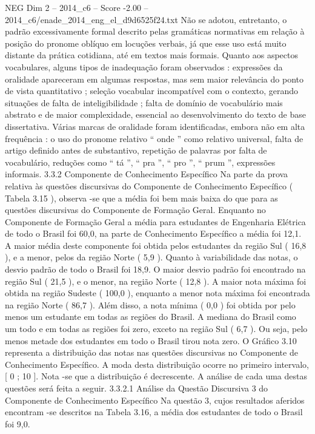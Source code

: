 \begin{textsample}{NEG Dim 2 – 2014\_c6 – Score -2.00 – 2014\_c6/enade\_2014\_eng\_el\_d9d6525f24.txt}
Não se adotou, entretanto, o padrão excessivamente formal descrito pelas gramáticas normativas em relação à posição do pronome oblíquo em locuções verbais, já que esse uso está muito distante da prática cotidiana, até em textos mais formais.
Quanto aos aspectos vocabulares, alguns tipos de inadequação foram observados : expressões da oralidade apareceram em algumas respostas, mas sem maior relevância do ponto de vista quantitativo ; seleção vocabular incompatível com o contexto, gerando situações de falta de inteligibilidade ; falta de domínio de vocabulário mais abstrato e de maior complexidade, essencial ao desenvolvimento do texto de base dissertativa.
Várias marcas de oralidade foram identificadas, embora não em alta frequência : o uso do pronome relativo “ onde ” como relativo universal, falta de artigo definido antes de substantivo, repetição de palavras por falta de vocabulário, reduções como “ tá ”, “ pra ”, “ pro ”, “ prum ”, expressões informais. 3.3.2 Componente de Conhecimento Específico Na parte da prova relativa às questões discursivas do Componente de Conhecimento Específico ( Tabela 3.15 ), observa -se que a média foi bem mais baixa do que para as questões discursivas do Componente de Formação Geral.
Enquanto no Componente de Formação Geral a média para estudantes de Engenharia Elétrica de todo o Brasil foi 60,0, na parte de Conhecimento Específico a média foi 12,1.
A maior média deste componente foi obtida pelos estudantes da região Sul ( 16,8 ), e a menor, pelos da região Norte ( 5,9 ).
Quanto à variabilidade das notas, o desvio padrão de todo o Brasil foi 18,9.
O maior desvio padrão foi encontrado na região Sul ( 21,5 ), e o menor, na região Norte ( 12,8 ).
A maior nota máxima foi obtida na região Sudeste ( 100,0 ), enquanto a menor nota máxima foi encontrada na região Norte ( 86,7 ).
Além disso, a nota mínima ( 0,0 ) foi obtida por pelo menos um estudante em todas as regiões do Brasil.
A mediana do Brasil como um todo e em todas as regiões foi zero, exceto na região Sul ( 6,7 ).
Ou seja, pelo menos metade dos estudantes em todo o Brasil tirou nota zero.
O Gráfico 3.10 representa a distribuição das notas nas questões discursivas no Componente de Conhecimento Específico.
A moda desta distribuição ocorre no primeiro intervalo, [ 0 ; 10 ].
Nota -se que a distribuição é decrescente.
A análise de cada uma destas questões será feita a seguir. 3.3.2.1 Análise da Questão Discursiva 3 do Componente de Conhecimento Específico Na questão 3, cujos resultados aferidos encontram -se descritos na Tabela 3.16, a média dos estudantes de todo o Brasil foi 9,0.

\end{textsample}
